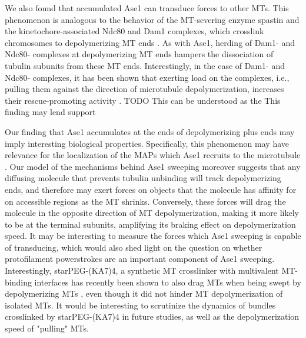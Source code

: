 We also found that accumulated Ase1 can transduce forces to other MTs. This phenomenon is analogous to the behavior of the MT-severing enzyme spastin and the kinetochore-associated Ndc80 and Dam1 complexes, which crosslink chromosomes to depolymerizing MT ends \parencite{Franck2007, umbreit2012ndc80, grishchuk2017biophysics}. As with Ase1, herding of Dam1- and Ndc80- complexes at depolymerizing MT ends hampers the dissociation of tubulin subunits from these MT ends. Interestingly, in the case of Dam1- and Ndc80- complexes, it has been shown that exerting load on the complexes, i.e., pulling them against the direction of microtubule depolymerization, increases their rescue-promoting activity \parencite{Franck2007, volkov2018multivalency}. TODO This can be understood as the This finding may lend support  \par

Our finding that Ase1 accumulates at the ends of depolymerizing plus ends may imply interesting biological properties. Specifically, this phenomenon may have relevance for the localization of the MAPs which Ase1 recruits to the microtubule . Our model of the mechanisms behind Ase1 sweeping moreover suggests that any diffusing molecule that prevents tubulin unbinding will track depolymerizing ends, and therefore may exert forces on objects that the molecule has affinity for on accessible regions as the MT shrinks. Conversely, these forces will drag the molecule in the opposite direction of MT depolymerization, making it more likely to be at the terminal subunits, amplifying its braking effect on depolymerization speed. It may be interesting to measure the forces which Ase1 sweeping is capable of transducing, which would also shed light on the question on whether protofilament powerstrokes are an important component of Ase1 sweeping. Interestingly, starPEG-(KA7)4, a synthetic MT crosslinker with multivalent MT-binding interfaces has recently been shown to also drag MTs when being swept by depolymerizing MTs \parencite{Drechsler2019}, even though it did not hinder MT depolymerization of isolated MTs. It would be interesting to scrutinize the dynamics of bundles crosslinked by starPEG-(KA7)4 in future studies, as well as the depolymerization speed of "pulling" MTs. \par
 
